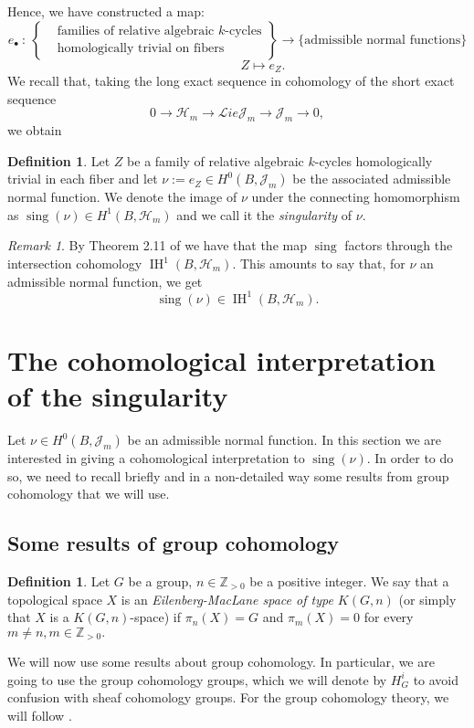 \documentclass[a4paper,12 pt,titlepage,twoside]{book}
\newcommand{\numberset}{\mathbb}
\newcommand{\Z}{\numberset{Z}}
\newcommand{\Lie}{\mathcal{L}ie}
\DeclareMathOperator{\sing}{sing}
\DeclareMathOperator{\IH}{IH}
\theoremstyle{plain}
\theoremstyle{theorem}
\theoremstyle{definition}
\newtheorem{defn}[thm]{Definition}
\theoremstyle{remark}
\newtheorem{oss}[thm]{Remark}
\begin{document}
	Hence, we have constructed a map:
	$$e_\bullet \ \colon \ \left\{\begin{aligned}&\text{families of relative algebraic $k$-cycles}\\&\text{homologically trivial on fibers}\end{aligned}\right\} \rightarrow \{\text{admissible normal functions}\}$$
	$$\qquad \qquad Z \mapsto e_Z.$$
	We recall that, taking the long exact sequence in cohomology of the short exact sequence $$0 \rightarrow \mathcal{H}_m \rightarrow \Lie\mathcal{J}_m \rightarrow \mathcal{J}_m \rightarrow0,$$ we obtain 
	\begin{center}
	\end{center}
	\begin{defn}
		Let $Z$ be a family of relative algebraic $k$-cycles homologically trivial in each fiber and let $\nu := e_Z \in H^0(B, \mathcal{J}_m)$ be the associated admissible normal function. We denote the image of $\nu$ under the connecting homomorphism as $\sing(\nu) \in H^1(B, \mathcal{H}_m)$ and we call it the \emph{singularity} of $\nu$.
	\end{defn}
	\begin{oss}
		By Theorem 2.11 of \cite{MR2534102} we have that the map $\sing$ factors through the intersection cohomology $\IH^1(B, \mathcal{H}_m)$. This amounts to say that, for $\nu$ an admissible normal function, we get $$\sing(\nu) \in \IH^1(B, \mathcal{H}_m).$$
	\end{oss}
	\section{The cohomological interpretation of the singularity}
	Let $\nu \in H^0(B, \mathcal{J}_m)$ be an admissible normal function. In this section we are interested in giving a cohomological interpretation to $\sing(\nu)$. In order to do so, we need to recall briefly and in a non-detailed way some results from group cohomology that we will use.
	\subsection{Some results of group cohomology}
	\begin{defn}
		Let $G$ be a group, $n \in \Z_{> 0}$ be a positive integer. We say that a topological space $X$ is an \emph{Eilenberg-MacLane space of type $K(G, n)$} (or simply that $X$ is a $K(G,n)$-space) if $\pi_n(X)= G$ and $\pi_m(X) =0$ for every $m \neq n, m \in \Z_{> 0}.$
	\end{defn}
	We will now use some results about group cohomology. In particular, we are going to use the group cohomology groups, which we will denote by $H^i_G$ to avoid confusion with sheaf cohomology groups. For the group cohomology theory, we will follow \cite{may_2013}.
	
\end{document}
